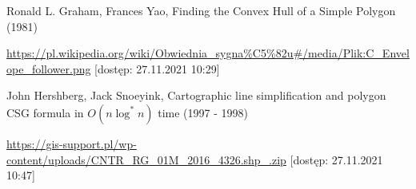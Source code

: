 \documentclass[11pt]{article}
\begin{document}
    \newpage
    \begin{center}
    \begin{Huge}
        \fontsize{46pt}{46pt}\selectfont{Źródła}
    \end{Huge}   
    \end{center}
    \begin{large} 
        \begin{enumerate}[label={[\arabic*]}]
        
            \item Ronald L. Graham, Frances Yao, Finding the Convex Hull of a Simple Polygon (1981)
            \item \url{https://pl.wikipedia.org/wiki/Obwiednia_sygna%C5%82u#/media/Plik:C_Envelope_follower.png}
               [dostęp: 27.11.2021 10:29] 
            \item John Hershberg, Jack Snoeyink, Cartographic line simplification and polygon CSG formula in $O\left(n\log^* n\right)$ time (1997 - 1998)
            \item \url{https://gis-support.pl/wp-content/uploads/CNTR_RG_01M_2016_4326.shp_.zip}
               [dostęp: 27.11.2021 10:47] 
        \end{enumerate}
    \end{large} 
\end{document}
